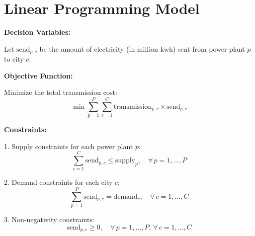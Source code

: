 \documentclass{article}
\begin{document}
\section*{Linear Programming Model}

\textbf{Decision Variables:}

Let \( \text{send}_{p,c} \) be the amount of electricity (in million kwh) sent from power plant \( p \) to city \( c \).

\textbf{Objective Function:}

Minimize the total transmission cost:
\[
\min \sum_{p=1}^{P} \sum_{c=1}^{C} \text{transmission}_{p,c} \times \text{send}_{p,c}
\]

\textbf{Constraints:}

1. Supply constraints for each power plant \( p \):
\[
\sum_{c=1}^{C} \text{send}_{p,c} \leq \text{supply}_{p}, \quad \forall \, p = 1, \ldots, P
\]

2. Demand constraints for each city \( c \):
\[
\sum_{p=1}^{P} \text{send}_{p,c} = \text{demand}_{c}, \quad \forall \, c = 1, \ldots, C
\]

3. Non-negativity constraints:
\[
\text{send}_{p,c} \geq 0, \quad \forall \, p = 1, \ldots, P, \, \forall \, c = 1, \ldots, C
\]
\end{document}
